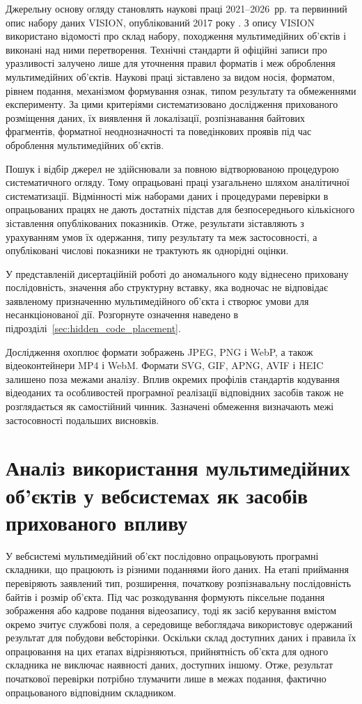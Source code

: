 Джерельну основу огляду становлять наукові праці 2021--2026~рр. та первинний опис набору даних VISION, опублікований 2017 року \cite{shullani2017vision}. З опису VISION використано відомості про склад набору, походження мультимедійних об’єктів і виконані над ними перетворення. Технічні стандарти й офіційні записи про уразливості залучено лише для уточнення правил форматів і меж оброблення мультимедійних об’єктів. Наукові праці зіставлено за видом носія, форматом, рівнем подання, механізмом формування ознак, типом результату та обмеженнями експерименту. За цими критеріями систематизовано дослідження прихованого розміщення даних, їх виявлення й локалізації, розпізнавання байтових фрагментів, форматної неоднозначності та поведінкових проявів під час оброблення мультимедійних об’єктів.

Пошук і відбір джерел не здійснювали за повною відтворюваною процедурою систематичного огляду. Тому опрацьовані праці узагальнено шляхом аналітичної систематизації. Відмінності між наборами даних і процедурами перевірки в опрацьованих працях не дають достатніх підстав для безпосереднього кількісного зіставлення опублікованих показників. Отже, результати зіставляють з урахуванням умов їх одержання, типу результату та меж застосовності, а опубліковані числові показники не трактують як однорідні оцінки.

У представленій дисертаційній роботі до аномального коду віднесено приховану послідовність, значення або структурну вставку, яка водночас не відповідає заявленому призначенню мультимедійного об’єкта і створює умови для несанкціонованої дії. Розгорнуте означення наведено в підрозділі~\ref{sec:hidden_code_placement}.

Дослідження охоплює формати зображень JPEG, PNG і WebP, а також відеоконтейнери MP4 і WebM. Формати SVG, GIF, APNG, AVIF і HEIC залишено поза межами аналізу. Вплив окремих профілів стандартів кодування відеоданих та особливостей програмної реалізації відповідних засобів також не розглядається як самостійний чинник. Зазначені обмеження визначають межі застосовності подальших висновків.

\section{Аналіз використання мультимедійних об’єктів у вебсистемах як засобів прихованого впливу}
\label{sec:multimedia_threat_carrier}

У вебсистемі мультимедійний об’єкт послідовно опрацьовують програмні складники, що працюють із різними поданнями його даних. На етапі приймання перевіряють заявлений тип, розширення, початкову розпізнавальну послідовність байтів і розмір об’єкта. Під час розкодування формують піксельне подання зображення або кадрове подання відеозапису, тоді як засіб керування вмістом окремо зчитує службові поля, а середовище вебоглядача використовує одержаний результат для побудови вебсторінки. Оскільки склад доступних даних і правила їх опрацювання на цих етапах відрізняються, прийнятність об’єкта для одного складника не виключає наявності даних, доступних іншому. Отже, результат початкової перевірки потрібно тлумачити лише в межах подання, фактично опрацьованого відповідним складником.

